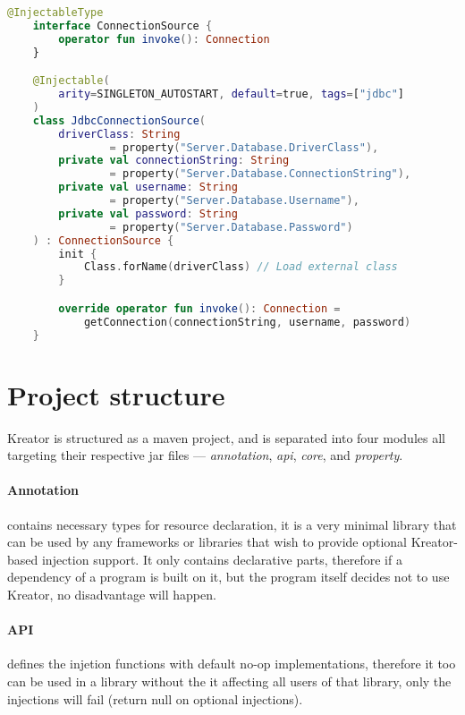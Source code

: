 		\begin{center}
			\begin{minipage}{13.5cm}
		\begin{lstlisting}[language=Kotlin, title={\emph{Example usage} --- \code{dbConnection.kt}}]
	@InjectableType
	interface ConnectionSource {
		operator fun invoke(): Connection
	}

	@Injectable(
		arity=SINGLETON_AUTOSTART, default=true, tags=["jdbc"]
	)
	class JdbcConnectionSource(
		driverClass: String
				= property("Server.Database.DriverClass"),
        private val connectionString: String
        		= property("Server.Database.ConnectionString"),
        private val username: String
        		= property("Server.Database.Username"),
        private val password: String
        		= property("Server.Database.Password")
	) : ConnectionSource {
		init {
	        Class.forName(driverClass) // Load external class
	    }

	    override operator fun invoke(): Connection =
	    	getConnection(connectionString, username, password)
	}
		\end{lstlisting}
			\end{minipage}
		\end{center}
	
	\section{Project structure}
	
	Kreator is structured as a maven project, and is separated into four modules all targeting their respective jar files --- \emph{annotation}, \emph{api}, \emph{core}, and \emph{property}.
	
	\paragraph{Annotation} contains necessary types for resource declaration, it is a very minimal library that can be used by any frameworks or libraries that wish to provide optional Kreator-based injection support. It only contains declarative parts, therefore if a dependency of a program is built on it, but the program itself decides not to use Kreator, no disadvantage will happen.
	
	\paragraph{API} defines the injetion functions with default no-op implementations, therefore it too can be used in a library without the it affecting all users of that library, only the injections will fail (return null on optional injections).
	
